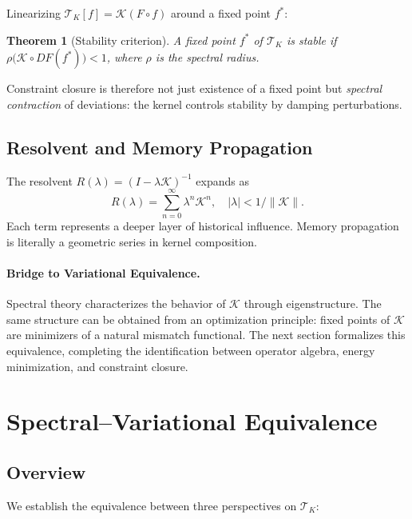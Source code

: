 \documentclass[12pt]{article}
\newtheorem{theorem}{Theorem}[section]
\newcommand{\TK}{\mathcal{T}_K}
\begin{document}
Linearizing $\TK[f] = \mathcal{K}(F\circ f)$ around a fixed point $f^*$:

\begin{theorem}[Stability criterion]
\label{thm:stability}
A fixed point $f^*$ of $\TK$ is stable if
$\rho\bigl(\mathcal{K}\circ DF(f^*)\bigr) < 1$,
where $\rho$ is the spectral radius.
\end{theorem}

Constraint closure is therefore not just existence of a fixed point but
\emph{spectral contraction} of deviations: the kernel controls stability
by damping perturbations.

\subsection{Resolvent and Memory Propagation}

The resolvent $R(\lambda) = (I - \lambda\mathcal{K})^{-1}$ expands as
\[
  R(\lambda) = \sum_{n=0}^\infty \lambda^n \mathcal{K}^n,
  \quad |\lambda| < 1/\|\mathcal{K}\|.
\]
Each term represents a deeper layer of historical influence. Memory
propagation is literally a geometric series in kernel composition.

\paragraph{Bridge to Variational Equivalence.}
Spectral theory characterizes the behavior of $\mathcal{K}$ through
eigenstructure. The same structure can be obtained from an optimization
principle: fixed points of $\mathcal{K}$ are minimizers of a natural
mismatch functional. The next section formalizes this equivalence,
completing the identification between operator algebra, energy minimization,
and constraint closure.

\section{Spectral--Variational Equivalence}
\label{sec:spectral_variational}

\subsection{Overview}

We establish the equivalence between three perspectives on $\TK$:
\end{document}
